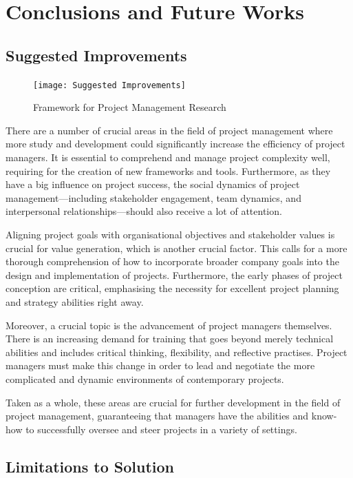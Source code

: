 \documentclass{article}
\begin{document}
\section{Conclusions and Future Works}
\subsection{Suggested Improvements}
\begin{figure}[htp]
    \centering
    \texttt{[image: Suggested Improvements]}
    \caption{Framework for Project Management Research}
    \label{fig:Suggested Improvements}
\end{figure}
There are a number of crucial areas in the field of project management where more study and development could significantly increase the efficiency of project managers. It is essential to comprehend and manage project complexity well, requiring for the creation of new frameworks and tools. Furthermore, as they have a big influence on project success, the social dynamics of project management—including stakeholder engagement, team dynamics, and interpersonal relationships—should also receive a lot of attention.

Aligning project goals with organisational objectives and stakeholder values is crucial for value generation, which is another crucial factor. This calls for a more thorough comprehension of how to incorporate broader company goals into the design and implementation of projects. Furthermore, the early phases of project conception are critical, emphasising the necessity for excellent project planning and strategy abilities right away.

Moreover, a crucial topic is the advancement of project managers themselves. There is an increasing demand for training that goes beyond merely technical abilities and includes critical thinking, flexibility, and reflective practises. Project managers must make this change in order to lead and negotiate the more complicated and dynamic environments of contemporary projects.

Taken as a whole, these areas are crucial for further development in the field of project management, guaranteeing that managers have the abilities and know-how to successfully oversee and steer projects in a variety of settings.\cite{winter2006directions}


\subsection{Limitations to Solution}
\end{document}
